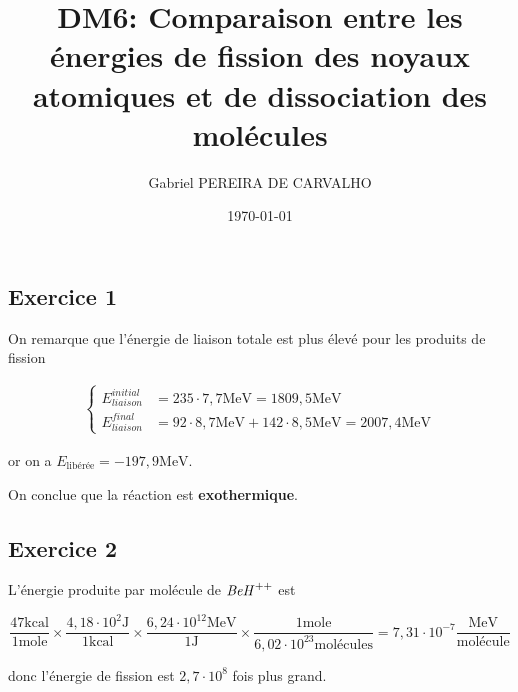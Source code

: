 \documentclass[french]{article}
\begin{document}
	\title{DM6: Comparaison entre les énergies de fission des noyaux atomiques et de dissociation des molécules}
	\author{Gabriel PEREIRA DE CARVALHO}
	\date{\today}
	
	\maketitle
	
	\subsection*{Exercice 1}
	
	On remarque que l'énergie de liaison totale est plus élevé pour les produits de fission
	
	\begin{align} 
	\begin{cases}
		E_{liaison}^{initial} &= 235 \cdot 7,7 \mathrm{MeV} = 1809,5 \mathrm{MeV}\\
		E_{liaison}^{final} &= 92 \cdot 8,7 \mathrm{MeV} + 142 \cdot 8,5 \mathrm{MeV}  = 2007,4 \mathrm{MeV}
	\end{cases}
	\end{align}
	
	or on a $E_{\mathrm{libérée}} = -197,9 \mathrm{MeV}$.
	
	On conclue que la réaction est \textbf{exothermique}.
	
	\subsection*{Exercice 2}
	
	L'énergie produite par molécule de $\text{\textit{BeH}}^{++}$ est
	
	$$ \frac{47 \mathrm{kcal}}{\mathrm{1 mole}} \times \frac{4,18 \cdot 10^2 \mathrm{J}}{1 \mathrm{kcal}} \times \frac{6,24 \cdot 10^{12} \mathrm{MeV} }{1 \mathrm{J}} \times \frac{1 \mathrm{mole}}{6,02 \cdot 10^{23}\mathrm{molécules}} = 7,31 \cdot 10^{-7} \frac{\mathrm{MeV}}{\mathrm{molécule}} $$
	
	donc l'énergie de fission est $2,7 \cdot 10^8$ fois plus grand. 
	
\end{document}
